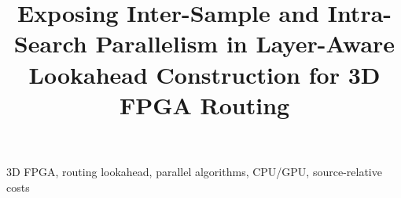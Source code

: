 \documentclass[conference,10pt,letterpaper]{IEEEtran}
\title{Exposing Inter-Sample and Intra-Search Parallelism in Layer-Aware Lookahead Construction for 3D FPGA Routing}
\author{\IEEEauthorblockN{Anonymous Authors}}
\begin{document}
\maketitle
\begin{abstract}\end{abstract}
\begin{IEEEkeywords}3D FPGA, routing lookahead, parallel algorithms, CPU/GPU, source-relative costs\end{IEEEkeywords}








\clearpage


\end{document}
